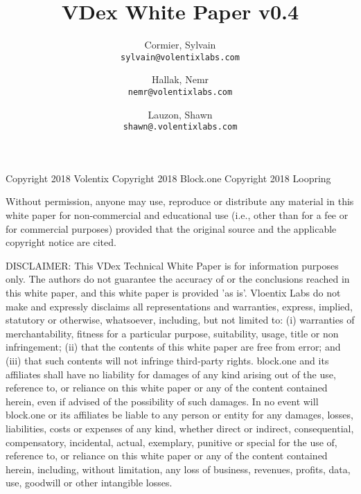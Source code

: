 \documentclass[]{article}
\title{VDex White Paper v0.4}
\author{
	Cormier, Sylvain\\
	\texttt{sylvain@volentixlabs.com}
	\and
	Hallak, Nemr\\
	\texttt{nemr@volentixlabs.com}
	\and
	Lauzon, Shawn\\
	\texttt{shawn@.volentixlabs.com}
}
\begin{document}
\tableofcontents
\maketitle

Copyright 2018 Volentix
Copyright 2018 Block.one
Copyright 2018 Loopring

Without permission, anyone may use, reproduce or distribute any material in this white paper for non-commercial and educational use (i.e., other than for a fee or for commercial purposes) provided that the original source and the applicable copyright notice are cited.

DISCLAIMER: This VDex Technical White Paper  is for information purposes only. The authors do not guarantee the accuracy of or the conclusions reached in this white paper, and this white paper is provided 'as is'. 
Vloentix Labs do not make and expressly disclaims all representations and warranties, express, implied, statutory or otherwise, whatsoever, including, but not limited to: (i) warranties of merchantability, fitness for a particular purpose, suitability, usage, title or non infringement; (ii) that the contents of this white paper are free from error; and (iii) that such contents will not infringe third-party rights. block.one and its affiliates shall have no liability for damages of any kind arising out of the use, reference to, or reliance on this white paper or any of the content contained herein, even if advised of the possibility of such damages. In no event will block.one or its affiliates be liable to any person or entity for any damages, losses, liabilities, costs or expenses of any kind, whether direct or indirect, consequential, compensatory, incidental, actual, exemplary, punitive or special for the use of, reference to, or reliance on this white paper or any of the content contained herein, including, without limitation, any loss of business, revenues, profits, data, use, goodwill or other intangible losses.
\end{document}
